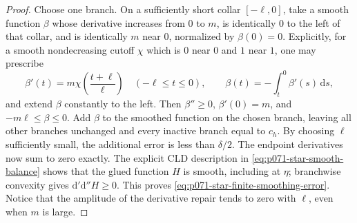 \begin{proof}
Choose one branch.  On a sufficiently short collar \([-\ell,0]\), take
a smooth function \(\beta\) whose derivative increases from \(0\) to
\(m\), is identically \(0\) to the left of that collar, and is identically
\(m\) near \(0\), normalized by \(\beta(0)=0\).  Explicitly, for a smooth
nondecreasing cutoff \(\chi\) which is \(0\) near \(0\) and \(1\) near
\(1\), one may prescribe
\[
 \beta'(t)=m\chi\!\left(\frac{t+\ell}{\ell}\right)
      \quad(-\ell\leq t\leq0),
 \qquad
 \beta(t)=-\int_t^0\beta'(s)\,\mathrm ds,
\]
and extend \(\beta\) constantly to the left.  Then
\(\beta''\geq0\), \(\beta'(0)=m\), and
\(-m\ell\leq\beta\leq0\).  Add \(\beta\) to the smoothed function on
the chosen branch, leaving all other branches unchanged and every
inactive branch equal to \(c_h\).  By choosing \(\ell\) sufficiently
small, the additional error is less than \(\delta/2\).  The endpoint
derivatives now sum to zero exactly.  The explicit CLD description in
\eqref{eq:p071-star-smooth-balance} shows that the glued function \(H\)
is smooth, including at \(\eta\); branchwise convexity gives
\(\mathrm d'\mathrm d''H\geq0\).  This proves
\eqref{eq:p071-star-finite-smoothing-error}.  Notice that the amplitude
of the derivative repair tends to zero with \(\ell\), even when \(m\)
is large.


\end{proof}
